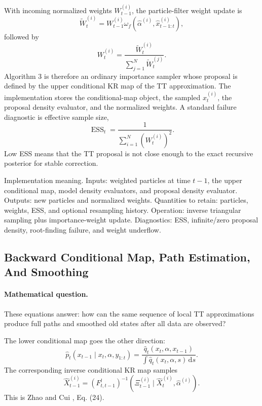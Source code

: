 \documentclass[11pt]{article}
\numberwithin{equation}{section}
\newcommand{\dd}{\,\mathrm d}
\begin{document}
With incoming normalized weights \(W_{t-1}^{(i)}\), the particle-filter weight
update is
\begin{equation}
    \widetilde W_t^{(i)}
    =
    W_{t-1}^{(i)}
    \omega_f(\widehat\alpha^{(i)},\widehat x_{t-1:t}^{(i)}),
    \label{eq:p24-f5}
\end{equation}
followed by
\begin{equation}
    W_t^{(i)}
    =
    \frac{\widetilde W_t^{(i)}}
    {\sum_{j=1}^{N}\widetilde W_t^{(j)}}.
    \label{eq:p24-f6}
\end{equation}
Algorithm 3 is therefore an ordinary importance sampler whose proposal is
defined by the upper conditional KR map of the TT approximation.  The
implementation stores the conditional-map object, the sampled \(x_t^{(i)}\),
the proposal density evaluator, and the normalized weights.  A standard failure
diagnostic is effective sample size,
\begin{equation}
    \operatorname{ESS}_t
    =
    \frac{1}{\sum_{i=1}^{N}(W_t^{(i)})^2}.
    \label{eq:p24-f7}
\end{equation}
Low ESS means that the TT proposal is not close enough to the exact recursive
posterior for stable correction.

Implementation meaning. Inputs: weighted particles at time \(t-1\), the
upper conditional map, model density evaluators, and proposal density evaluator.
Outputs: new particles and normalized weights.  Quantities to retain: particles,
weights, ESS, and optional resampling history.  Operation: inverse triangular
sampling plus importance-weight update.  Diagnostics: ESS, infinite/zero
proposal density, root-finding failure, and weight underflow.

\subsection{Backward Conditional Map, Path Estimation, And Smoothing}

\paragraph{Mathematical question.}
These equations answer: how can the same sequence of local TT approximations
produce full paths and smoothed old states after all data are observed?

The lower conditional map goes the other direction:
\begin{equation}
    \widehat p_t(x_{t-1}\mid x_t,\alpha,y_{1:t})
    =
    \frac{\widehat q_t(x_t,\alpha,x_{t-1})}
    {\int \widehat q_t(x_t,\alpha,s)\dd s}.
    \label{eq:p24-b1}
\end{equation}
The corresponding inverse conditional KR map samples
\begin{equation}
    \widehat X_{t-1}^{(i)}
    =
    (F_{t,t-1}^{l})^{-1}
    \left(\Xi_{t-1}^{(i)}\mid \widehat X_t^{(i)},\widehat\alpha^{(i)}\right).
    \label{eq:p24-b2}
\end{equation}
This is Zhao and Cui \cite{zhao2024ttsequential}, Eq. (24).
\end{document}
